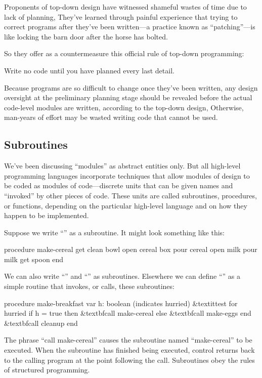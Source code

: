 Proponents of top-down design have witnessed shameful wastes of time
due to lack of planning, They've learned through painful experience
that trying to correct programs after they've been written---a
practice known as ``patching''\hy---is like locking the barn door after
the horse has bolted.

So they offer as a countermeasure this official rule of top-down
programming:
\begin{tfquot}
Write no code until you have planned every last detail.
\end{tfquot}
Because programs are so difficult to change once they've been written,
any design oversight at the preliminary planning stage should be
revealed before the actual code-level modules are written, according
to the top-down design, Otherwise, man-years of effort may be wasted
writing code that cannot be used.%
%


\subsection{Subroutines}%
%
We've been discussing ``modules'' as abstract entities only. But
all high-level programming languages incorporate techniques that allow
modules of design to be coded as modules of code---discrete units
that can be given names and ``invoked'' by other pieces of code. These
units are called subroutines, procedures, or functions, depending
on the particular high-level language and on how they happen to be
implemented.

Suppose we write ``'' as a subroutine. It might look
something like this:
\begin{Code}[fontfamily=cmss]
procedure make-cereal
   get clean bowl
   open cereal box
   pour cereal
   open milk
   pour milk
   get spoon
end
\end{Code}
We can also write ``'' and ``'' as
subroutines.  Elsewhere we can define ``'' as a
simple routine that invokes, or calls, these subroutines:

\begin{Code}[fontfamily=cmss,commandchars=\&\{\}]
procedure make-breakfast
   var h: boolean (indicates hurried)
   &textit{test for hurried}
   if h = true then
      &textbf{call make-cereal}
   else
      &textbf{call make-eggs}
   end
   &textbf{call cleanup}
end
\end{Code}
\medskip
The phrase ``call make-cereal'' causes the subroutine named
``make-cereal'' to be executed. When the subroutine has finished being
executed, control returns back to the calling program at the point
following the call.  Subroutines obey the rules of structured
programming.

